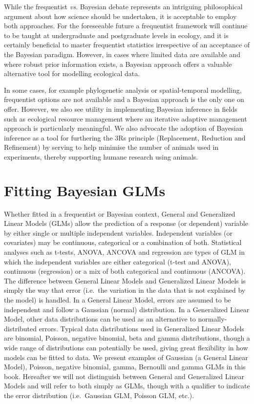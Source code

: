 \documentclass[
]{book}
\begin{document}
While the frequentist \emph{vs.} Bayesian debate represents an intriguing philosophical argument about how science should be undertaken, it is acceptable to employ both approaches. For the foreseeable future a frequentist framework will continue to be taught at undergraduate and postgraduate levels in ecology, and it is certainly beneficial to master frequentist statistics irrespective of an acceptance of the Bayesian paradigm. However, in cases where limited data are available and where robust prior information exists, a Bayesian approach offers a valuable alternative tool for modelling ecological data.

In some cases, for example phylogenetic analysis or spatial-temporal modelling, frequentist options are not available and a Bayesian approach is the only one on offer. However, we also see utility in implementing Bayesian inference in fields such as ecological resource management where an iterative adaptive management approach is particularly meaningful. We also advocate the adoption of Bayesian inference as a tool for furthering the 3Rs principle (Replacement, Reduction and Refinement) by serving to help minimise the number of animals used in experiments, thereby supporting humane research using animals.

\hypertarget{fit-glms}{%
\section{Fitting Bayesian GLMs}\label{fit-glms}}

Whether fitted in a frequentist or Bayesian context, General and Generalized Linear Models (GLMs) allow the prediction of a response (or dependent) variable by either single or multiple independent variables. Independent variables (or covariates) may be continuous, categorical or a combination of both. Statistical analyses such as t-tests, ANOVA, ANCOVA and regression are types of GLM in which the independent variables are either categorical (t-test and ANOVA), continuous (regression) or a mix of both categorical and continuous (ANCOVA). The difference between General Linear Models and Generalized Linear Models is simply the way that error (i.e.~the variation in the data that is not explained by the model) is handled. In a General Linear Model, errors are assumed to be independent and follow a Gaussian (normal) distribution. In a Generalized Linear Model, other data distributions can be used as an alternative to normally-distributed errors. Typical data distributions used in Generalized Linear Models are binomial, Poisson, negative binomial, beta and gamma distributions, though a wide range of distributions can potentially be used, giving great flexibility in how models can be fitted to data. We present examples of Gaussian (a General Linear Model), Poisson, negative binomial, gamma, Bernoulli and gamma GLMs in this book. Hereafter we will not distinguish between General and Generalized Linear Models and will refer to both simply as GLMs, though with a qualifier to indicate the error distribution (i.e.~Gaussian GLM, Poisson GLM, etc.).
\end{document}
